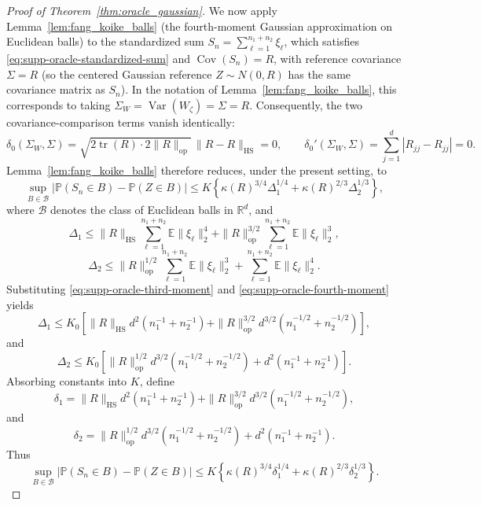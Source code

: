 \documentclass[
  12pt]{article}
\theoremstyle{plain}
\theoremstyle{definition}
\theoremstyle{remark}
\begin{document}
\begin{proof}[Proof of Theorem~\ref{thm:oracle_gaussian}]
We now apply Lemma~\ref{lem:fang_koike_balls} (the
\citealp{fang_large-dimensional_2021} fourth-moment Gaussian
approximation on Euclidean balls) to the standardized sum
\(S_n=\sum_{\ell=1}^{n_1+n_2}\xi_\ell\), which satisfies
\eqref{eq:supp-oracle-standardized-sum} and \(\operatorname{Cov}(S_n)=R\),
with reference covariance \(\Sigma=R\) (so the centered Gaussian reference
\(Z\sim N(0,R)\) has the same covariance matrix as \(S_n\)). In the notation of
Lemma~\ref{lem:fang_koike_balls}, this corresponds to taking
\(\Sigma_W=\operatorname{Var}(W_\zeta)=\Sigma=R\). Consequently, the two
covariance-comparison terms vanish identically:
\[
\delta_0(\Sigma_W,\Sigma)
=
\sqrt{2\operatorname{tr}(R)\cdot 2\|R\|_{\mathrm{op}}}\,\|R-R\|_{\mathrm{HS}}
=
0,
\qquad
\delta_0'(\Sigma_W,\Sigma)
=
\sum_{j=1}^d|R_{jj}-R_{jj}|
=0.
\]
Lemma~\ref{lem:fang_koike_balls} therefore reduces, under the present setting,
to
\[
\sup_{B\in\mathcal B}
\left|
\mathbb P(S_n\in B)-\mathbb P(Z\in B)
\right|
\le
K
\left\{
\kappa(R)^{3/4}\Delta_1^{1/4}
+
\kappa(R)^{2/3}\Delta_2^{1/3}
\right\},
\]
where \(\mathcal B\) denotes the class of Euclidean balls in \(\mathbb R^d\),
and
\[
\Delta_1
\le
\|R\|_{\mathrm{HS}}
\sum_{\ell=1}^{n_1+n_2}\mathbb E\|\xi_\ell\|_2^4
+
\|R\|_{\mathrm{op}}^{3/2}
\sum_{\ell=1}^{n_1+n_2}\mathbb E\|\xi_\ell\|_2^3,
\]
\[
\Delta_2
\le
\|R\|_{\mathrm{op}}^{1/2}
\sum_{\ell=1}^{n_1+n_2}\mathbb E\|\xi_\ell\|_2^3
+
\sum_{\ell=1}^{n_1+n_2}\mathbb E\|\xi_\ell\|_2^4.
\]
Substituting \eqref{eq:supp-oracle-third-moment} and
\eqref{eq:supp-oracle-fourth-moment} yields
\[
\Delta_1
\le
K_0
\left[
\|R\|_{\mathrm{HS}}
d^2
\left(n_1^{-1}+n_2^{-1}\right)
+
\|R\|_{\mathrm{op}}^{3/2}
d^{3/2}
\left(n_1^{-1/2}+n_2^{-1/2}\right)
\right],
\]
and
\[
\Delta_2
\le
K_0
\left[
\|R\|_{\mathrm{op}}^{1/2}
d^{3/2}
\left(n_1^{-1/2}+n_2^{-1/2}\right)
+
d^2
\left(n_1^{-1}+n_2^{-1}\right)
\right].
\]
Absorbing constants into \(K\), define
\[
\delta_1
=
\|R\|_{\mathrm{HS}}
d^2
\left(n_1^{-1}+n_2^{-1}\right)
+
\|R\|_{\mathrm{op}}^{3/2}
d^{3/2}
\left(n_1^{-1/2}+n_2^{-1/2}\right),
\]
and
\[
\delta_2
=
\|R\|_{\mathrm{op}}^{1/2}
d^{3/2}
\left(n_1^{-1/2}+n_2^{-1/2}\right)
+
d^2
\left(n_1^{-1}+n_2^{-1}\right).
\]
Thus
\begin{equation}
\label{eq:supp-oracle-ball-approx}
\sup_{B\in\mathcal B}
\left|
\mathbb P(S_n\in B)-\mathbb P(Z\in B)
\right|
\le
K
\left\{
\kappa(R)^{3/4}\delta_1^{1/4}
+
\kappa(R)^{2/3}\delta_2^{1/3}
\right\}.
\end{equation}


\end{proof}
\end{document}
